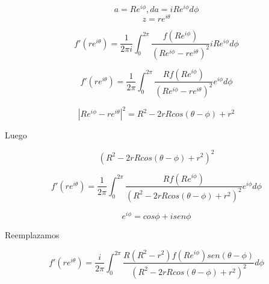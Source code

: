 \documentclass[a4paper,12pt]{article}
\begin{document}
\[ a = Re^{i\phi}, da = iRe^{i\phi}d\phi \]
\[z=re^{i\theta}\]

\[ f'(re^{i\theta}) = \frac{1}{2\pi i}\int_{0}^{2\pi}\frac{f(Re^{i\phi})}{(Re^{i\phi}-re^{i\theta})^2}iRe^{i\phi}d\phi \]

\[ f'(re^{i\theta}) = \frac{1}{2\pi}\int_{0}^{2\pi}\frac{Rf(Re^{i\phi})}{(Re^{i\phi}-re^{i\theta})^2}e^{i\phi}d\phi \]

\[ |Re^{i\phi}-re^{i\theta}|^2 = R^2-2rRcos(\theta-\phi)+r^2 \]

Luego 

\[ (R^2-2rRcos(\theta-\phi)+r^2)^2 \]

\[ f'(re^{i\theta}) = \frac{1}{2\pi}\int_{0}^{2\pi}\frac{Rf(Re^{i\phi})}{(R^2-2rRcos(\theta-\phi)+r^2)^2}e^{i\phi}d\phi \]

\[ e^{i\phi} = cos\phi+isen\phi \]

Reemplazamos

\[ f'(re^{i\theta}) = \frac{i}{2\pi}\int_{0}^{2\pi}\frac{R(R^2-r^2)f(Re^{i\phi})sen(\theta-\phi)}{(R^2-2rRcos(\theta-\phi)+r^2)^2}d\phi \]

\newpage

\renewcommand{\refname}{Bibliografía}

\end{document}
